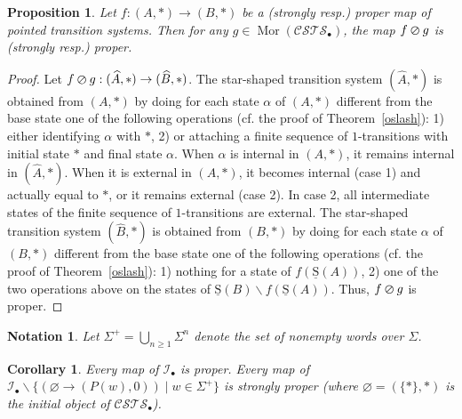 \documentclass[a4paper,12pt]{amsart}
\newtheorem{prop}[thm]{Proposition}
\newtheorem{cor}[thm]{Corollary}
\newtheorem{nota}[thm]{Notation}
\begin{document}
\begin{prop} \label{oslash-proper} Let $f:(A,*)\to (B,*)$ be a (strongly resp.)
proper map of pointed transition systems. Then for any $g\in
\operatorname{Mor}({\mathcal{C\!S\!T\!S}}_\bullet)$, the map $f \varoslash g$ is (strongly resp.)
proper.  \end{prop}

\begin{proof} Let $f \varoslash g:(\widehat{A},*) \to (\widehat{B},*)$. The
star-shaped transition system $(\widehat{A},*)$ is obtained from
$(A,*)$ by doing for each state $\alpha$ of $(A,*)$ different from the
base state one of the following operations (cf. the proof of
Theorem~\ref{oslash}): 1) either identifying $\alpha$ with $*$, 2) or
attaching a finite sequence of $1$-transitions with initial state $*$
and final state $\alpha$. When $\alpha$ is internal in $(A,*)$, it
remains internal in $(\widehat{A},*)$. When it is external in $(A,*)$,
it becomes internal (case 1) and actually equal to $*$, or it remains
external (case 2). In case 2, all intermediate states of the finite
sequence of $1$-transitions are external. The star-shaped transition
system $(\widehat{B},*)$ is obtained from $(B,*)$ by doing for each
state $\alpha$ of $(B,*)$ different from the base state one of the
following operations (cf. the proof of Theorem~\ref{oslash}): 1)
nothing for a state of $f(\operatorname{\underline{S}}(A))$, 2) one of the two operations above
on the states of $\operatorname{\underline{S}}(B)\backslash f(\operatorname{\underline{S}}(A))$. Thus, $f \varoslash g$
is proper.  \end{proof}

\begin{nota} Let $\Sigma^+ = \bigcup_{n{\geqslant} 1} \Sigma^n$ denote the
  set of nonempty words over $\Sigma$. \end{nota}

\begin{cor} \label{ex1} Every map of ${\mathcal{I}}_\bullet$ is proper. Every map
  of ${\mathcal{I}}_\bullet \backslash \{(\varnothing \to (P(w),0)) \mid w\in
  \Sigma^+\}$ is strongly proper (where $\varnothing=(\{*\},*)$ is the
  initial object of ${\mathcal{C\!S\!T\!S}}_\bullet$).
\end{cor}
\end{document}
